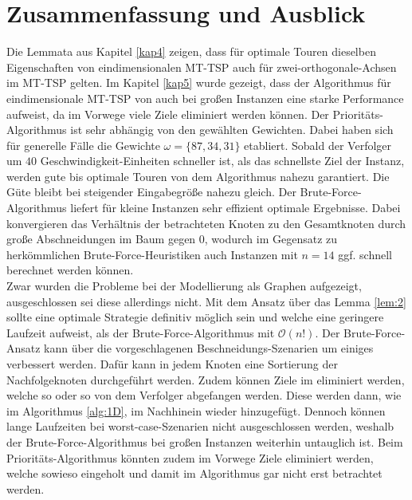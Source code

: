 \documentclass[german,version-2019-11]{uzl-thesis}
\begin{document}
\chapter{Zusammenfassung und Ausblick}
Die Lemmata aus Kapitel \ref{kap4} zeigen, dass für optimale Touren dieselben Eigenschaften von eindimensionalen MT-TSP auch für zwei-orthogonale-Achsen im MT-TSP gelten. Im Kapitel \ref{kap5} wurde gezeigt, dass der Algorithmus für eindimensionale MT-TSP von \cite{helvig} auch bei großen Instanzen eine starke Performance aufweist, da im Vorwege viele Ziele eliminiert werden können. 
Der Prioritäts-Algorithmus ist sehr abhängig von den gewählten Gewichten. Dabei haben sich für generelle Fälle die Gewichte $\omega=\{87,34,31\}$ etabliert. Sobald der Verfolger um $40$ Geschwindigkeit-Einheiten schneller ist, als das schnellste Ziel der Instanz, werden gute bis optimale Touren von dem Algorithmus nahezu garantiert. Die Güte bleibt bei steigender Eingabegröße nahezu gleich. Der Brute-Force-Algorithmus liefert für kleine Instanzen sehr effizient optimale Ergebnisse. Dabei konvergieren das Verhältnis der betrachteten Knoten zu den Gesamtknoten durch große Abschneidungen im Baum gegen $0$, wodurch im Gegensatz zu herkömmlichen Brute-Force-Heuristiken auch Instanzen mit $n=14$ ggf. schnell berechnet werden können. \\
\noindent
Zwar wurden die Probleme bei der Modellierung als Graphen aufgezeigt, ausgeschlossen sei diese allerdings nicht. Mit dem Ansatz über das Lemma \ref{lem:2} sollte eine optimale Strategie definitiv möglich sein und welche eine geringere Laufzeit aufweist, als der Brute-Force-Algorithmus mit $\mathcal{O}(n!)$. Der Brute-Force-Ansatz kann über die vorgeschlagenen Beschneidungs-Szenarien um einiges verbessert werden. Dafür kann in jedem Knoten eine Sortierung der Nachfolgeknoten durchgeführt werden. Zudem können Ziele im eliminiert werden, welche so oder so von dem Verfolger abgefangen werden. Diese werden dann, wie im  Algorithmus \ref{alg:1D}, im Nachhinein wieder hinzugefügt. Dennoch können lange Laufzeiten bei worst-case-Szenarien nicht ausgeschlossen werden, weshalb der Brute-Force-Algorithmus bei großen Instanzen weiterhin  untauglich ist. Beim Prioritäts-Algorithmus könnten zudem im Vorwege Ziele eliminiert werden, welche sowieso eingeholt und damit im Algorithmus gar nicht erst betrachtet werden. \\
\end{document}
